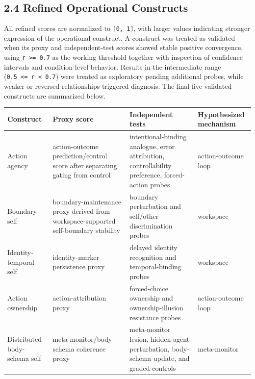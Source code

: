\documentclass[
  11pt,
  letterpaper,
]{article}
\newcounter{none} %
\begin{document}
\subsection{2.4 Refined Operational
Constructs}\label{refined-operational-constructs}

All refined scores are normalized to \texttt{{[}0,\ 1{]}}, with larger
values indicating stronger expression of the operational construct. A
construct was treated as validated when its proxy and independent-test
scores showed stable positive convergence, using
\texttt{r\ \textgreater{}=\ 0.7} as the working threshold together with
inspection of confidence intervals and condition-level behavior. Results
in the intermediate range
(\texttt{0.5\ \textless{}=\ r\ \textless{}\ 0.7}) were treated as
exploratory pending additional probes, while weaker or reversed
relationships triggered diagnosis. The final five validated constructs
are summarized below.

{\def\LTcaptype{none} %
\begin{longtable}[]{@{}
  >{\raggedright\arraybackslash}p{}
  >{\raggedright\arraybackslash}p{}
  >{\raggedright\arraybackslash}p{}
  >{\raggedright\arraybackslash}p{}@{}}
\toprule\noalign{}
\begin{minipage}[b]{\linewidth}\raggedright
Construct
\end{minipage} & \begin{minipage}[b]{\linewidth}\raggedright
Proxy score
\end{minipage} & \begin{minipage}[b]{\linewidth}\raggedright
Independent tests
\end{minipage} & \begin{minipage}[b]{\linewidth}\raggedright
Hypothesized mechanism
\end{minipage} \\
\midrule\noalign{}
\endhead
\bottomrule\noalign{}
\endlastfoot
Action agency & action-outcome prediction/control score after separating
gating from control & intentional-binding analogue, error attribution,
controllability preference, forced-action probes & action-outcome
loop \\
Boundary self & boundary-maintenance proxy derived from
workspace-supported self-boundary stability & boundary perturbation and
self/other discrimination probes & workspace \\
Identity-temporal self & identity-marker persistence proxy & delayed
identity recognition and temporal-binding probes & workspace \\
Action ownership & action-attribution proxy & forced-choice ownership
and ownership-illusion resistance probes & action-outcome loop \\
Distributed body-schema self & meta-monitor/body-schema coherence proxy
& meta-monitor lesion, hidden-agent perturbation, body-schema update,
and graded controls & meta-monitor \\
\end{longtable}
}
\end{document}
